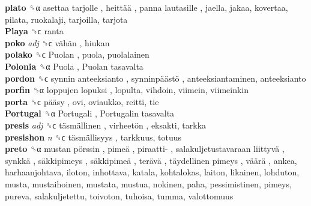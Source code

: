 \textbf{plato} ␝α   asettaa tarjolle ,  heittää ,  panna lautasille , jaella, jakaa, kovertaa, pilata, ruokalaji, tarjoilla, tarjota  \\
\textbf{Playa} ␝ϲ  ranta  \\
\textbf{poko} \emph{adj}  ␝ϲ   vähän , hiukan  \\
\textbf{polako} ␝ϲ   Puolan , puola, puolalainen  \\
\textbf{Polonia} ␝α   Puola ,  Puolan tasavalta   \\
\textbf{pordon} ␝ϲ   synnin anteeksianto ,  synninpäästö , anteeksiantaminen, anteeksianto  \\
\textbf{porfin} ␝α   loppujen lopuksi , lopulta, vihdoin, viimein, viimeinkin  \\
\textbf{porta} ␝ϲ   pääsy , ovi, oviaukko, reitti, tie  \\
\textbf{Portugal} ␝α   Portugali ,  Portugalin tasavalta   \\
\textbf{presis} \emph{adj}  ␝ϲ   täsmällinen ,  virheetön , eksakti, tarkka  \\
\textbf{presishon} \emph{n}  ␝ϲ   täsmällisyys , tarkkuus, totuus  \\
\textbf{preto} ␝α   mustan pörssin ,  pimeä ,  piraatti- ,  salakuljetustavaraan liittyvä ,  synkkä ,  säkkipimeys ,  säkkipimeä ,  terävä ,  täydellinen pimeys ,  väärä , ankea, harhaanjohtava, iloton, inhottava, katala, kohtalokas, laiton, likainen, lohduton, musta, mustaihoinen, mustata, mustua, nokinen, paha, pessimistinen, pimeys, pureva, salakuljetettu, toivoton, tuhoisa, tumma, valottomuus  \\
